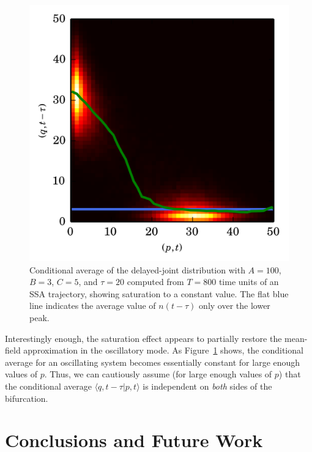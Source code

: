 \documentclass[english,letterpaper,12pt]{report}
\begin{document}
\begin{doublespacing}
\begin{figure}
    \begin{center}
        \includegraphics{../results/thesis/ddjd-ca-a100-c5-t20.png}
    \end{center}
    \caption{Conditional average of the delayed-joint distribution with $A=100$, $B=3$, $C=5$, and $\tau=20$ computed from $T=800$ time units of an SSA trajectory, showing saturation to a constant value. The flat blue line indicates the average value of $n(t-\tau)$ only over the lower peak.}
    \label{fig:ddjd-osc-sat}
\end{figure}

Interestingly enough, the saturation effect appears to partially restore the mean-field approximation in the oscillatory mode. As Figure~\ref{fig:ddjd-osc-sat} shows, the conditional average for an oscillating system becomes essentially constant for large enough values of $p$. Thus, we can cautiously assume (for large enough values of $p$) that the conditional average $\langle q, t - \tau | p, t \rangle$ is independent on \emph{both} sides of the bifurcation.



\chapter{Conclusions and Future Work} %
\label{sec:conclusions}


\end{doublespacing}
\end{document}

